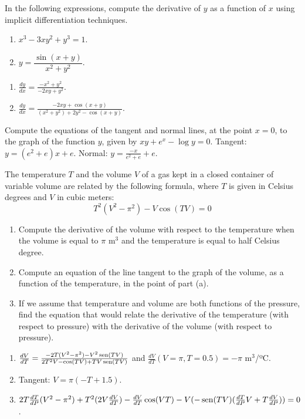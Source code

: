 
{In the following expressions, compute the derivative of $y$ as a function of $x$ using implicit differentiation techniques.
\begin{multicols}{2}
\begin{enumerate}
\item $x^3-3xy^2+y^3=1$.
\item $y=\dfrac{\sin(x+y)}{x^2+y^2}$.
\end{enumerate}
\end{multicols}
}
{\begin{enumerate}
\item $\frac{dy}{dx}=\frac{-x^2+y^2}{-2xy+y^2}.$
\item $\frac{dy}{dx}=\frac{-2xy+\cos(x+y)}{(x^2+y^2)+2y^2-\cos(x+y)}.$
\end{enumerate}
}
{
}


{Compute the equations of the tangent and normal lines, at the point $x=0$, to the graph of the function $y$, given by $xy+e^x-\log y=0$.
}
{Tangent: $y=(e^2+e)x+e$. Normal: $y=\frac{-x}{e^2+e}+e$.
}
{
}


{The temperature $T$ and the volume $V$ of a gas kept in a closed container of variable volume are related by the following formula,
where $T$ is given in Celsius degrees and $V$ in cubic meters:
\[
T^2(V^2-\pi^2)-V\cos(TV)=0
\]
\begin{enumerate}
\item Compute the derivative of the volume with respect to the temperature when the volume is equal to $\pi$ m$^3$ and the temperature
is equal to half Celsius degree.
\item Compute an equation of the line tangent to the graph of the volume, as a function of the temperature, in the point of part (a).
\item If we assume that temperature and volume are both functions of the pressure, find the equation that would relate the derivative of the
temperature (with respect to pressure) with the derivative of the volume (with respect to pressure).
\end{enumerate}
}
{\begin{enumerate}
\item $\frac{dV}{dT} = \frac{-2T(V^2-\pi^2)-V^2\operatorname{sen}(TV)}{2T^2V-\cos(TV)+TV\operatorname{sen}(TV)}$ and $\frac{dV}{dT}(V=\pi,T=0.5)= -\pi$ m$^3$/ºC.
\item Tangent: $V=\pi(-T+1.5)$.
\item $2T\frac{dT}{dP}(V^2-\pi^2)+T^2(2V\frac{dV}{dT})-\frac{dV}{dT}\cos(VT)-V(-\operatorname{sen}(TV)(\frac{dT}{dP}V+T\frac{dV}{dP})) =0$.
\end{enumerate}
}
{
}


